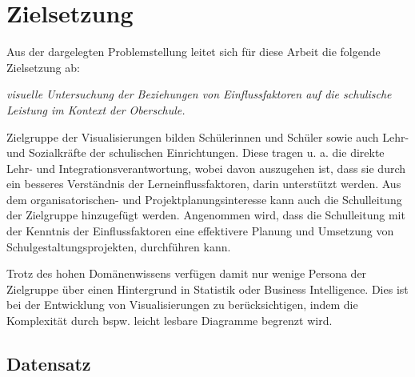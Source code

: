 \chapter[Zielsetzung]{Zielsetzung}

Aus der dargelegten Problemstellung leitet sich für diese Arbeit die folgende Zielsetzung ab:

\begin{center}
    \textit{visuelle Untersuchung der Beziehungen von Einflussfaktoren auf die schulische Leistung im Kontext der Oberschule.}
\end{center}    

Zielgruppe der Visualisierungen bilden Schülerinnen und Schüler sowie auch Lehr- und Sozialkräfte der schulischen Einrichtungen. 
Diese tragen u. a. die direkte Lehr- und Integrationsverantwortung, wobei davon auszugehen ist, dass sie durch ein besseres Verständnis der Lerneinflussfaktoren, darin unterstützt werden.
Aus dem organisatorischen- und Projektplanungsinteresse kann auch die Schulleitung der Zielgruppe hinzugefügt werden.
Angenommen wird, dass die Schulleitung mit der Kenntnis der Einflussfaktoren eine effektivere Planung und Umsetzung von Schulgestaltungsprojekten, durchführen kann.

Trotz des hohen Domänenwissens verfügen damit nur wenige Persona der Zielgruppe über einen Hintergrund in Statistik oder Business Intelligence.
Dies ist bei der Entwicklung von Visualisierungen zu berücksichtigen, indem die Komplexität durch bspw. leicht lesbare Diagramme begrenzt wird.


\section[Untersuchter Datensatz]{Datensatz}

